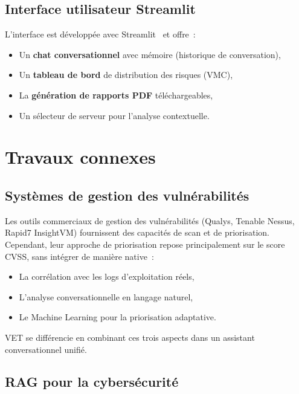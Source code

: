 \documentclass[runningheads]{llncs}
\begin{document}
\subsection{Interface utilisateur Streamlit}

L'interface est développée avec Streamlit~\cite{streamlit2023} et offre~:
\begin{itemize}[nosep]
    \item Un \textbf{chat conversationnel} avec mémoire (historique de conversation),
    \item Un \textbf{tableau de bord} de distribution des risques (VMC),
    \item La \textbf{génération de rapports PDF} téléchargeables,
    \item Un sélecteur de serveur pour l'analyse contextuelle.
\end{itemize}


\section{Travaux connexes}

\subsection{Systèmes de gestion des vulnérabilités}

Les outils commerciaux de gestion des vulnérabilités (Qualys, Tenable Nessus, Rapid7 InsightVM) fournissent des capacités de scan et de priorisation. Cependant, leur approche de priorisation repose principalement sur le score CVSS, sans intégrer de manière native~:
\begin{itemize}[nosep]
    \item La corrélation avec les logs d'exploitation réels,
    \item L'analyse conversationnelle en langage naturel,
    \item Le Machine Learning pour la priorisation adaptative.
\end{itemize}

VET se différencie en combinant ces trois aspects dans un assistant conversationnel unifié.

\subsection{RAG pour la cybersécurité}
\end{document}
